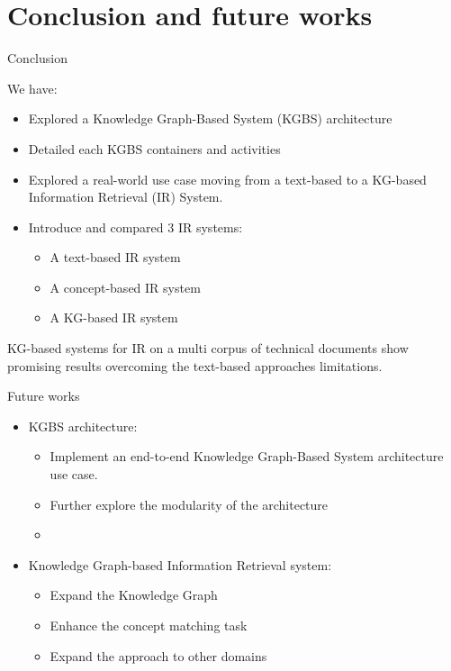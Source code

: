 \section[Conclusion]{Conclusion and future works}

\begin{frame}{Conclusion}

    We have:
    \begin{itemize}
        \item Explored a Knowledge Graph-Based System (KGBS) architecture
        \item Detailed each KGBS containers and activities
        \item Explored a real-world use case moving from a text-based to a KG-based Information Retrieval (IR) System.
        \item Introduce and compared $3$ IR systems:
        \begin{itemize}
            \item A text-based IR system
            \item A concept-based IR system
            \item A KG-based IR system
        \end{itemize}
    \end{itemize}

     \begin{center}
        KG-based systems for IR on a multi corpus of technical documents show promising results overcoming the text-based approaches limitations.   
     \end{center}

\end{frame}

\begin{frame}{Future works}

    \begin{itemize}
        \item KGBS architecture:
        \begin{itemize}
            \item Implement an end-to-end Knowledge Graph-Based System architecture use case.
            \item Further explore the modularity of the architecture
        \end{itemize}
        \begin{itemize}
            \item 
        \end{itemize}
        \item Knowledge Graph-based Information Retrieval system:
        \begin{itemize}
            \item Expand the Knowledge Graph
            \item Enhance the concept matching task
            \item Expand the approach to other domains
        \end{itemize}
    \end{itemize}

\end{frame}

